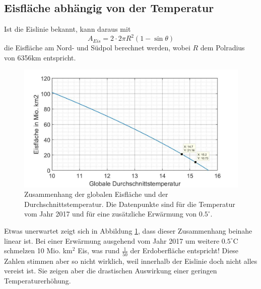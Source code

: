 \begin{refsection}
\subsection{Eisfläche abhängig von der Temperatur}
Ist die Eislinie bekannt, kann daraus mit
\begin{equation} \label{skript:eis:Eisfläche}
	A_{Eis}=2\cdot 2\pi R^2(1-\sin\theta)
\end{equation}
die Eisfläche am Nord- und Südpol berechnet werden, wobei $R$ dem Polradius von 6356km entspricht.
\begin{figure}
	\centering
	\includegraphics[width=14cm]{eis/Eisflaeche_abh_von_der_Temperatur.jpg}
	\caption{Zusammenhang der globalen Eisfläche und der Durchschnittstemperatur. Die Datenpunkte sind für die Temperatur vom Jahr 2017 und für eine zusätzliche Erwärmung von $0.5^{\circ}$.}
	\label{skript:eis:fig:Eisflaeche_abh_von_der_Temperatur}
\end{figure}
Etwas unerwartet zeigt sich in Abbildung \ref{skript:eis:fig:Eisflaeche_abh_von_der_Temperatur}, dass dieser Zusammenhang beinahe linear ist. Bei einer Erwärmung ausgehend vom Jahr 2017 um weitere $0.5^{\circ}$C schmelzen 10 Mio. km$^2$ Eis, was rund $\tfrac{1}{50}$ der Erdoberfläche entspricht! Diese Zahlen stimmen aber so nicht wirklich, weil innerhalb der Eislinie doch nicht alles vereist ist. Sie zeigen aber die drastischen Auswirkung einer geringen Temperaturerhöhung.

\end{refsection}
